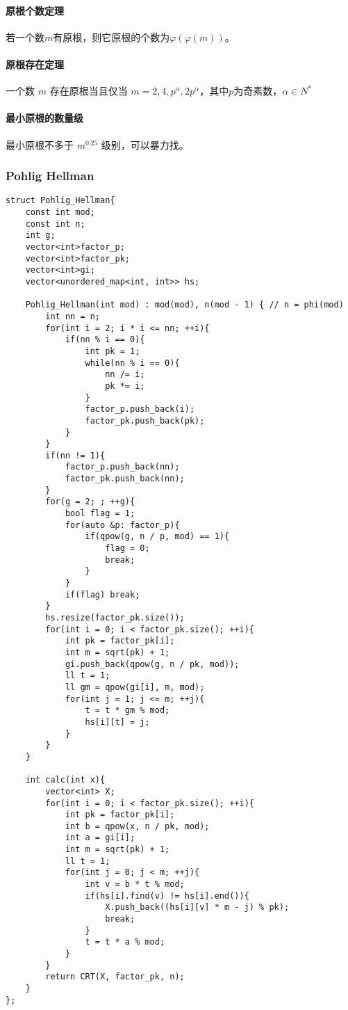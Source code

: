 \documentclass{ctexart}
\begin{document}
\paragraph{原根个数定理} 
若一个数$m$有原根，则它原根的个数为$\varphi(\varphi(m))$。
\paragraph{原根存在定理}
一个数 $m$ 存在原根当且仅当 $m = 2, 4, p^\alpha, 2p^\alpha$，其中$p$为奇素数，$\alpha \in N^*$
\paragraph{最小原根的数量级}
最小原根不多于 $m^{0.25}$ 级别，可以暴力找。
\subsubsection{Pohlig Hellman}
\begin{lstlisting}
struct Pohlig_Hellman{
	const int mod;
	const int n;
	int g;
	vector<int>factor_p;
	vector<int>factor_pk;
	vector<int>gi;
	vector<unordered_map<int, int>> hs;
	
	Pohlig_Hellman(int mod) : mod(mod), n(mod - 1) { // n = phi(mod)
		int nn = n;
		for(int i = 2; i * i <= nn; ++i){
			if(nn % i == 0){
				int pk = 1;
				while(nn % i == 0){
					nn /= i;
					pk *= i;
				}
				factor_p.push_back(i);
				factor_pk.push_back(pk);
			}
		}
		if(nn != 1){
			factor_p.push_back(nn);
			factor_pk.push_back(nn);
		}
		for(g = 2; ; ++g){
			bool flag = 1;
			for(auto &p: factor_p){
				if(qpow(g, n / p, mod) == 1){
					flag = 0;
					break;
				}
			}
			if(flag) break;
		}
		hs.resize(factor_pk.size());
		for(int i = 0; i < factor_pk.size(); ++i){
			int pk = factor_pk[i];
			int m = sqrt(pk) + 1;
			gi.push_back(qpow(g, n / pk, mod));
			ll t = 1;
			ll gm = qpow(gi[i], m, mod);
			for(int j = 1; j <= m; ++j){
				t = t * gm % mod;
				hs[i][t] = j;
			}
		}
	}

	int calc(int x){
		vector<int> X;
		for(int i = 0; i < factor_pk.size(); ++i){
			int pk = factor_pk[i];
			int b = qpow(x, n / pk, mod);
			int a = gi[i];
			int m = sqrt(pk) + 1;
			ll t = 1;
			for(int j = 0; j < m; ++j){
				int v = b * t % mod;
				if(hs[i].find(v) != hs[i].end()){
					X.push_back((hs[i][v] * m - j) % pk);
					break;
				}
				t = t * a % mod;
			}
		}
		return CRT(X, factor_pk, n);
	}
};
\end{lstlisting}
\end{document}
